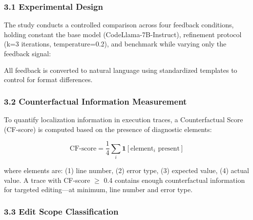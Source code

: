 
\subsubsection{3.1 Experimental Design}

The study conducts a controlled comparison across four feedback conditions, holding constant the base model (CodeLlama-7B-Instruct), refinement protocol (k=3 iterations, temperature=0.2), and benchmark while varying only the feedback signal:

\begin{table}[htbp]
\centering
{}
\end{table}

All feedback is converted to natural language using standardized templates to control for format differences.

\subsubsection{3.2 Counterfactual Information Measurement}

To quantify localization information in execution traces, a Counterfactual Score (CF-score) is computed based on the presence of diagnostic elements:

$$\text{CF-score} = \frac{1}{4}\sum_{i} \mathbf{1}[\text{element}_i \text{ present}]$$

where elements are: (1) line number, (2) error type, (3) expected value, (4) actual value. A trace with CF-score $\geq$ 0.4 contains enough counterfactual information for targeted editing---at minimum, line number and error type.

\subsubsection{3.3 Edit Scope Classification}


